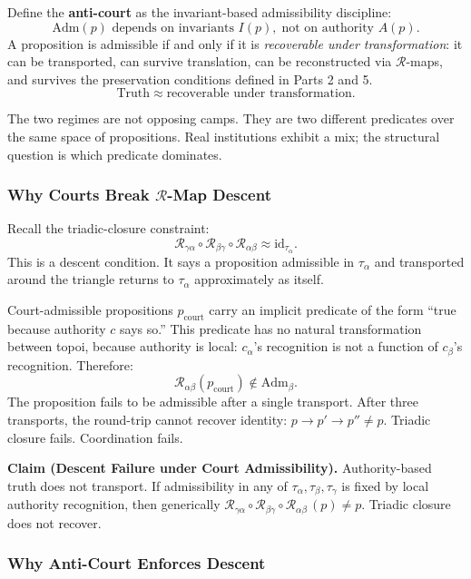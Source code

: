 \documentclass[
]{article}
\begin{document}
Define the \textbf{anti-court} as the invariant-based admissibility
discipline:
\[
  \mathrm{Adm}(p) \text{ depends on invariants } I(p),\;
  \text{not on authority } A(p).
\]
A proposition is admissible if and only if it is \emph{recoverable
under transformation}: it can be transported, can survive
translation, can be reconstructed via \(\mathcal{R}\)-maps, and survives the
preservation conditions defined in Parts 2 and 5.
\[
  \mathrm{Truth} \approx \text{recoverable under transformation}.
\]

The two regimes are not opposing camps. They are two different
predicates over the same space of propositions. Real institutions
exhibit a mix; the structural question is which predicate
dominates.

\subsubsection{Why Courts Break \(\mathcal{R}\)-Map
Descent}\label{why-courts-break-r-map-descent}

Recall the triadic-closure constraint:
\[
  \mathcal{R}_{\gamma\alpha} \circ \mathcal{R}_{\beta\gamma} \circ
  \mathcal{R}_{\alpha\beta} \approx \mathrm{id}_{\tau_\alpha}.
\]
This is a descent condition. It says a proposition admissible in
\(\tau_\alpha\) and transported around the triangle returns to
\(\tau_\alpha\) approximately as itself.

Court-admissible propositions \(p_{\text{court}}\) carry an
implicit predicate of the form ``true because authority \(c\) says
so.'' This predicate has no natural transformation between topoi,
because authority is local: \(c_\alpha\)'s recognition is not a
function of \(c_\beta\)'s recognition. Therefore:
\[
  \mathcal{R}_{\alpha\beta}(p_{\text{court}}) \notin
  \mathrm{Adm}_\beta.
\]
The proposition fails to be admissible after a single transport.
After three transports, the round-trip cannot recover identity:
\(p \to p' \to p'' \neq p\). Triadic closure fails. Coordination
fails.

\textbf{Claim (Descent Failure under Court Admissibility).}
Authority-based truth does not transport. If admissibility in any
of \(\tau_\alpha, \tau_\beta, \tau_\gamma\) is fixed by local
authority recognition, then generically
\(\mathcal{R}_{\gamma\alpha} \circ \mathcal{R}_{\beta\gamma} \circ
\mathcal{R}_{\alpha\beta}\,(p) \neq p\). Triadic closure does not
recover.

\subsubsection{Why Anti-Court Enforces
Descent}\label{why-anti-court-enforces-descent}
\end{document}
